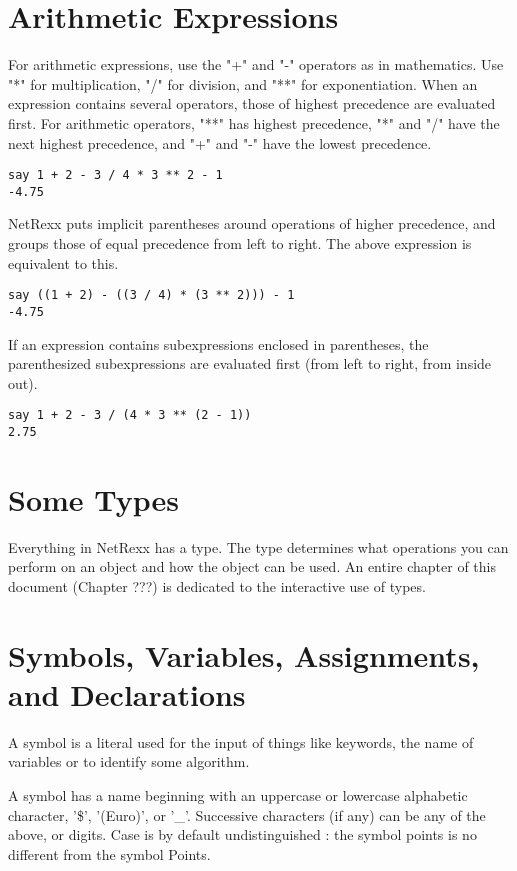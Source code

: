  \section{Arithmetic Expressions}

For arithmetic expressions, use the "+" and "-" operators as in mathematics. Use "*" for multiplication, "/" for division, and "**" for exponentiation. When an expression contains several operators, those of highest precedence are evaluated first. For arithmetic operators, "**" has highest precedence, "*" and "/" have the next highest precedence, and "+" and "-" have the lowest precedence.
\begin{verbatim}
say 1 + 2 - 3 / 4 * 3 ** 2 - 1
-4.75
\end{verbatim}
NetRexx puts implicit parentheses around operations of higher precedence, and groups those of equal precedence from left to right. The above expression is equivalent to this.

\begin{verbatim}
say ((1 + 2) - ((3 / 4) * (3 ** 2))) - 1
-4.75
\end{verbatim}
If an expression contains subexpressions enclosed in parentheses, the parenthesized subexpressions are evaluated first (from left to right, from inside out).

\begin{verbatim}
say 1 + 2 - 3 / (4 * 3 ** (2 - 1))
2.75
\end{verbatim}
\section{Some Types}

Everything in NetRexx has a type. The type determines what operations you can perform on an object and how the object can be used. An entire chapter of this document (Chapter ???) is dedicated to the interactive use of types.


\section{Symbols, Variables, Assignments, and Declarations}

A symbol is a literal used for the input of things like keywords, the name of variables or to identify some algorithm.

A symbol has a name beginning with an uppercase or lowercase alphabetic character, '\$', '(Euro)', or '\_'. Successive characters (if any) can be any of the above, or digits. Case is by default undistinguished : the symbol points is no different from the symbol Points.

